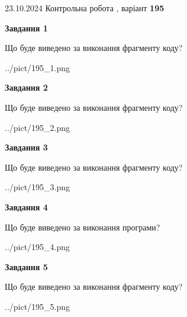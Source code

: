\documentclass[12pt, ukrainian]{article}
\begin{document}
{\Large{23.10.2024 Контрольна робота , варіант  \No \textbf { 195 }\par}}
{
\begin {large}
{\begin {center}\textbf{Завдання 1}\end {center}}

Що буде виведено за виконання фрагменту коду?\par
\begin{center}
	{../pict/195_1.png}
\end{center}
\newpage

{\begin {center}\textbf{Завдання 2}\end {center}}

Що буде виведено за виконання фрагменту коду?\par
\begin{center}
	{../pict/195_2.png}
\end{center}
\newpage

{\begin {center}\textbf{Завдання 3}\end {center}}

Що буде виведено за виконання фрагменту коду?\par
\begin{center}
	{../pict/195_3.png}
\end{center}
\newpage

{\begin {center}\textbf{Завдання 4}\end {center}}

Що буде виведено за виконання програми?\par
\begin{center}
	{../pict/195_4.png}
\end{center}
\newpage

{\begin {center}\textbf{Завдання 5}\end {center}}

Що буде виведено за виконання фрагменту коду?\par
\begin{center}
	{../pict/195_5.png}
\end{center}
\newpage


\end{large}}
\end{document}
